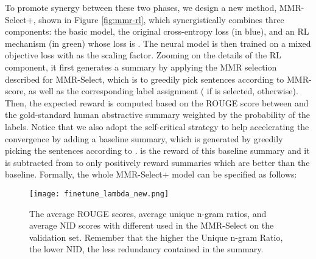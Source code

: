 \documentclass[11pt,a4paper]{article}
\begin{document}
To promote synergy between these two phases, we design a new method, MMR-Select+, shown in Figure \ref{fig:mmr-rl}, which synergistically combines three components: the basic model, the original cross-entropy loss (in blue), and an RL mechanism (in green) whose loss is . The neural model is then trained on a mixed objective loss  with  as the scaling factor. Zooming on the details of the RL component, it first generates a summary  by applying the  MMR selection described for MMR-Select, which is to greedily pick sentences according to MMR-score, as well as the corresponding label assignment  ( if  is selected,  otherwise). Then, the expected reward is computed based on the ROUGE score between  and the gold-standard human abstractive summary  weighted by the probability of the  labels. Notice that we also adopt the self-critical strategy \cite{rl-abstractive} to help accelerating the convergence by adding a baseline summary, which is generated by greedily picking the sentences according to .  is the reward of this baseline summary and it is subtracted from  to only positively reward summaries which are better than the baseline. Formally, the whole MMR-Select+ model can be specified as follows:
\vspace{-2mm}

\vspace{-2mm}
\begin{figure*}
    \centering
    \texttt{[image: finetune\_lambda\_new.png]}
    \vspace{-1mm}
    \caption{The average ROUGE scores, average unique n-gram ratios, and average NID scores with different  used in the MMR-Select on the validation set. Remember that the higher the Unique n-gram Ratio, the lower NID, the less redundancy contained in the summary.}
    \label{fig:finetune}
\end{figure*}
\end{document}
